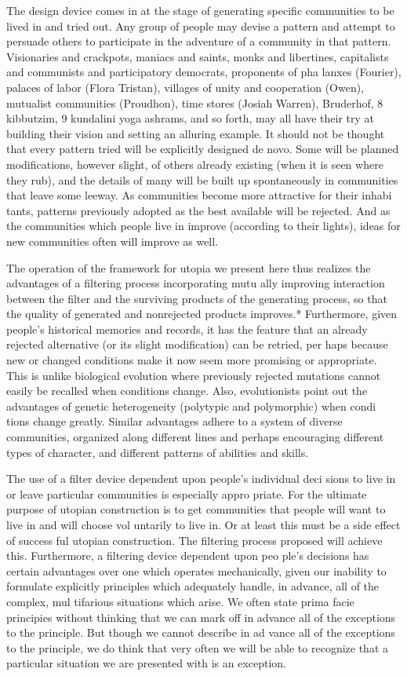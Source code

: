 \documentclass[11pt,openany]{book}
\begin{document}
The design device comes in at the stage of generating specific communities to be lived in and tried out. Any group of people may devise a pattern and attempt to persuade others to participate in the adventure of a community in that pattern. Visionaries and crackpots, maniacs and saints, monks and libertines, capitalists and communists and participatory democrats, proponents of pha lanxes (Fourier), palaces of labor (Flora Tristan), villages of unity and cooperation (Owen), mutualist communities (Proudhon), time stores (Josiah Warren), Bruderhof, 8 kibbutzim, 9 kundalini yoga ashrams, and so forth, may all have their try at building their vision and setting an alluring example. It should not be thought that every pattern tried will be explicitly designed de novo. Some will be planned modifications, however slight, of others already existing (when it is seen where they rub), and the details of many will be built up spontaneously in communities that leave some leeway. As communities become more attractive for their inhabi tants, patterns previously adopted as the best available will be rejected. And as the communities which people live in improve (according to their lights), ideas for new communities often will improve as well. 

The operation of the framework for utopia we present here thus realizes the advantages of a filtering process incorporating mutu ally improving interaction between the filter and the surviving products of the generating process, so that the quality of generated and nonrejected products improves.* Furthermore, given people's historical memories and records, it has the feature that an already rejected alternative (or its slight modification) can be retried, per haps because new or changed conditions make it now seem more promising or appropriate. This is unlike biological evolution where previously rejected mutations cannot easily be recalled when conditions change. Also, evolutionists point out the advantages of genetic heterogeneity (polytypic and polymorphic) when condi tions change greatly. Similar advantages adhere to a system of diverse communities, organized along different lines and perhaps encouraging different types of character, and different patterns of abilities and skills. 

The use of a filter device dependent upon people's individual deci sions to live in or leave particular communities is especially appro priate. For the ultimate purpose of utopian construction is to get communities that people will want to live in and will choose vol untarily to live in. Or at least this must be a side effect of success ful utopian construction. The filtering process proposed will achieve this. Furthermore, a filtering device dependent upon peo ple's decisions has certain advantages over one which operates mechanically, given our inability to formulate explicitly principles which adequately handle, in advance, all of the complex, mul tifarious situations which arise. We often state prima facie principies without thinking that we can mark off in advance all of the exceptions to the principle. But though we cannot describe in ad vance all of the exceptions to the principle, we do think that very often we will be able to recognize that a particular situation we are presented with is an exception. 
\end{document}
